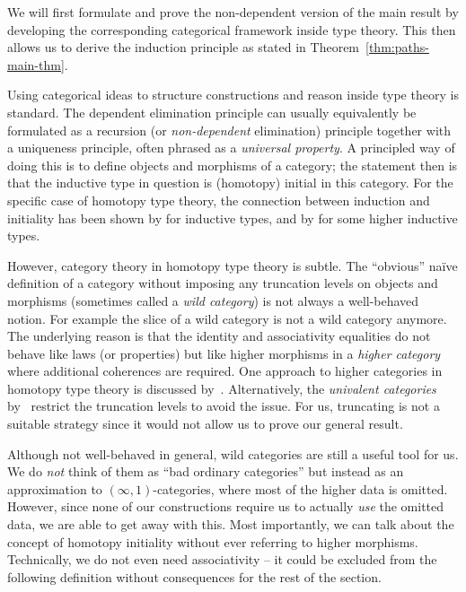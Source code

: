 We will first formulate and prove the non-dependent version of the main result
by developing the corresponding categorical framework inside type theory.
This then allows us to derive the induction principle as stated in Theorem~\ref{thm:paths-main-thm}.

Using categorical ideas to structure constructions and reason inside type
theory is standard.
The dependent elimination principle can usually equivalently be formulated
as a recursion (or \emph{non-dependent} elimination) principle together
with a uniqueness principle,
often phrased as a \emph{universal property}.
A principled way of doing this is to define objects and morphisms of a
category; the statement then is that the inductive type in question is
(homotopy) initial in this category.
For the specific case of homotopy type theory, the connection between
induction and initiality has been shown by
\cite{awodeyGamSoja_hoAlgs} for inductive types,
and by \cite{DBLP:journals/corr/Sojakova14} for some higher inductive types.

However, category theory in homotopy type theory is subtle.
The ``obvious'' naïve definition of a category without imposing any
truncation levels on objects and morphisms (sometimes called a
\emph{wild category}) is not always a well-behaved notion.
For example the slice of a wild category is not a wild category anymore.
The underlying reason is that the identity and associativity
equalities do not behave like laws (or properties) but like higher morphisms
in a \emph{higher category} where additional coherences are required.
One approach to higher categories in homotopy type theory
is discussed by~\cite{Capriotti2017}.
Alternatively, the \emph{univalent categories} by~\cite{ahrens_rezk}
restrict the truncation levels to avoid the issue.
For us,
truncating is not a suitable strategy since it would not allow us to prove our general result.

Although not well-behaved in general, wild categories are still a useful tool
for us.
We do \emph{not} think of them as ``bad ordinary categories'' but instead
as an approximation to $(\infty,1)$-categories, where most of the
higher data is omitted.
However, since none of our constructions require us to actually \emph{use}
the omitted data, we are able to get away with this.
Most importantly,
we can talk about the concept of homotopy initiality without ever referring
to higher morphisms.
Technically, we do not even need associativity -- it could be excluded from the
following definition without consequences for the rest of the section.

